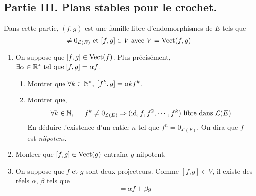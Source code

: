 \subsection*{Partie III. Plans stables pour le crochet.}
Dans cette partie, $(f,g)$ est une famille libre d'endomorphismes de $E$ tels que 
\begin{displaymath}
[f,g]\neq 0_{\mathcal{L}(E)} \text{ et }  [f,g]\in V \text{ avec } V = \Vect(f,g)
\end{displaymath}

\begin{enumerate}
\item On suppose que $[f,g]\in \operatorname{Vect}(f)$. Plus précisément, $\exists \alpha \in \mathbb{R}^*\text{ tel que } [f,g] = \alpha f$.
\begin{enumerate}
\item Montrer que $\forall k\in \mathbb{N}^{*}, \; [f^k,g]  = \alpha k f^{k}$.
\item Montrer que, 
\begin{displaymath}
\forall k\in \mathbb{N},\hspace{0.5cm} f^{k}\neq 0_{\mathcal{L}(E)}
\Rightarrow
(\mathrm{id},f,f^{2},\cdots,f^{k}) \text{ libre dans } \mathcal{L}(E)
\end{displaymath}
En déduire l'existence d'un entier $n$ tel que $f^{n}=0_{\mathcal{L}(E)}$. On dira que $f$ est \emph{nilpotent}.
\end{enumerate}

\item Montrer que $[f,g]\in \operatorname{Vect}(g)$ entraîne $g$ nilpotent.

\item On suppose que $f$ et $g$ sont deux projecteurs. Comme $[f,g]\in V$, il existe des réels $\alpha$, $\beta$ tels que 
\begin{displaymath}
  [f,g] = \alpha f + \beta g
\end{displaymath}


\end{enumerate}
